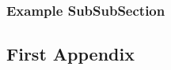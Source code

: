 \documentclass[12pt,letterpaper]{article}
\begin{document}
  \subsubsection{Example SubSubSection}
  \clearpage
  
  \clearpage
  \begin{appendices}
    \section{First Appendix}
  \end{appendices}
\end{document}
